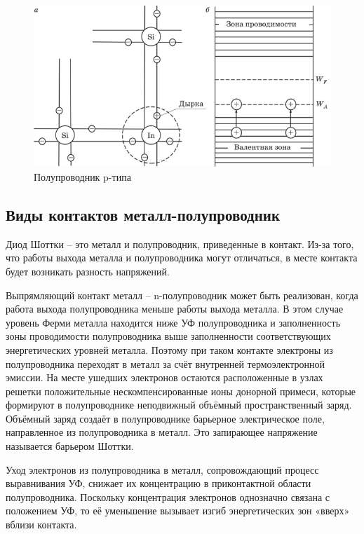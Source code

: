 \documentclass[a4paper,12pt]{article}
\begin{document}
\begin{figure}[h!]
	\begin{center}
	\includegraphics[scale = 0.7]{fig8}
	\caption{Полупроводник p-типа}
	\end{center}
\end{figure}

\subsection{Виды контактов металл-полупроводник}

Диод Шоттки – это металл и полупроводник, приведенные в контакт. Из-за того, что работы выхода металла и полупроводника могут отличаться, в месте контакта будет возникать разность напряжений. 

Выпрямляющий контакт металл -- n-полупроводник может быть реализован, когда работа выхода полупроводника меньше работы выхода металла. В этом случае уровень Ферми металла находится ниже УФ полупроводника и заполненность зоны проводимости полупроводника выше заполненности соответствующих энергетических уровней металла. Поэтому при таком контакте электроны из полупроводника переходят в металл за счёт внутренней термоэлектронной эмиссии. На месте ушедших электронов остаются расположенные в узлах решетки положительные нескомпенсированные ионы донорной примеси, которые формируют в полупроводнике неподвижный объёмный пространственный заряд. Объёмный заряд создаёт в полупроводнике барьерное электрическое поле, направленное из полупроводника в металл. Это запирающее напряжение называется барьером Шоттки.

Уход электронов из полупроводника в металл, сопровождающий процесс выравнивания УФ, снижает их концентрацию в приконтактной области полупроводника. Поскольку концентрация электронов однозначно связана с положением УФ, то её уменьшение вызывает изгиб энергетических зон «вверх» вблизи контакта.
\end{document}
